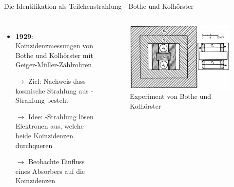 \documentclass[aspectratio=1610, professionalfonts, 9pt, hyperref={colorlinks=false}]{beamer}
\begin{document}
\begin{frame}{Die Identifikation als Teilchenstrahlung - Bothe und Kolhörster}
  \begin{columns}
      \begin{itemize}
        \setlength\itemsep{0.5em}
        \item \textbf{1929}: Koinzidenzmessungen von Bothe und Kolhörster mit Geiger-Müller-Zählrohren
        \item [$\rightarrow$] Ziel: Nachweis dass kosmische Strahlung aus \gamma-Strahlung besteht
        \item [$\rightarrow$] Idee: \gamma-Strahlung lösen Elektronen aus, welche beide Koinzidenzen durchqueren
        \item [$\rightarrow$] Beobachte Einfluss eines Absorbers auf die Koinzidenzen
      \end{itemize}
        \vspace*{10px}
  
      \begin{figure}
          \centering
          \includegraphics[width=\linewidth]{images/The-experiment-of-Bothe-and-Kolhoerster-in-Ref-48-Coincidences-between-counters-Z-1.png}
          \caption{Experiment von Bothe und Kolhörster \cite{ko}}
      \end{figure}
  \end{columns}
\end{frame}
\end{document}
